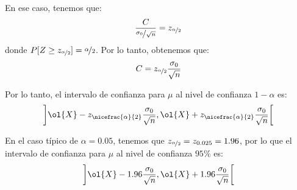 \begin{ejemplo}
    En ese caso, tenemos que:
    \begin{align*}
        \dfrac{C}{\nicefrac{\sigma_0}{\sqrt{n}}} = z_{\nicefrac{\alpha}{2}}
    \end{align*}
    donde $P[Z\geq z_{\nicefrac{\alpha}{2}}] = \nicefrac{\alpha}{2}$. Por lo tanto, obtenemos que:
    \begin{align*}
        C = z_{\nicefrac{\alpha}{2}} \dfrac{\sigma_0}{\sqrt{n}}
    \end{align*}

    Por lo tanto, el intervalo de confianza para $\mu$ al nivel de confianza $1 - \alpha$ es:
    \begin{align*}
        \left]\ol{X} - z_{\nicefrac{\alpha}{2}} \dfrac{\sigma_0}{\sqrt{n}}, \ol{X} + z_{\nicefrac{\alpha}{2}} \dfrac{\sigma_0}{\sqrt{n}}\right[
    \end{align*}

    En el caso típico de $\alpha = 0.05$, tenemos que $z_{\nicefrac{\alpha}{2}} = z_{0.025} = 1.96$, por lo que el intervalo de confianza para $\mu$ al nivel de confianza $95\%$ es:
    \begin{align*}
        \left]\ol{X} - 1.96 \dfrac{\sigma_0}{\sqrt{n}}, \ol{X} + 1.96 \dfrac{\sigma_0}{\sqrt{n}}\right[
    \end{align*}
        
\end{ejemplo}



